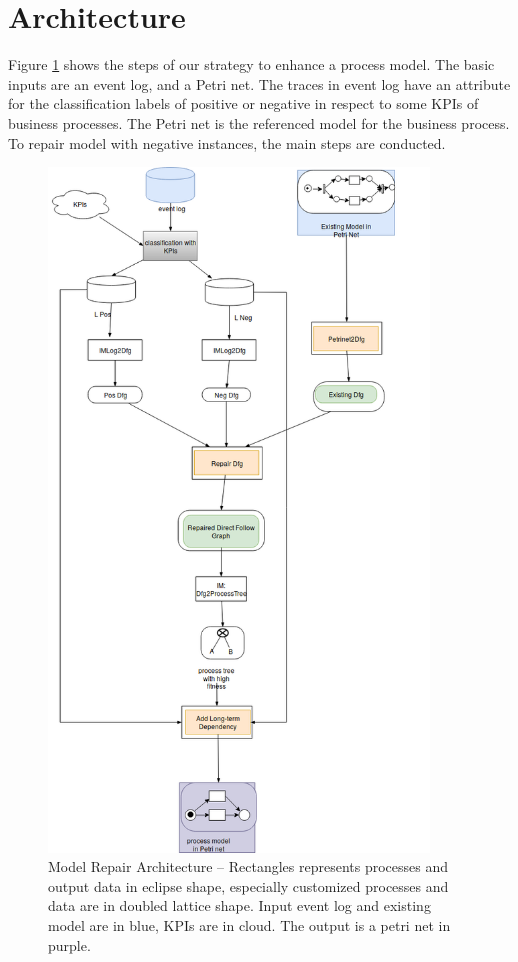 \section{Architecture}
Figure \ref{fig:architecture} shows the steps of our strategy to enhance a process model. The basic inputs are an event log, and a Petri net. The traces in event log have an attribute for the classification labels of positive or negative in respect to some KPIs of business processes. The Petri net is the referenced model for the business process. To repair model with negative instances, the main steps are conducted.
\begin{figure}
	\includegraphics[width=0.9\textwidth, height=0.9\textheight]{figures/algorithm/FD_architecture_detail_02.png}
	\caption[Model Repair Architecture]{Model Repair Architecture -- \small Rectangles represents processes and output data in eclipse shape, especially customized processes and data are in doubled lattice shape. Input event log and existing model are in blue, KPIs are in cloud. The output is a petri net in purple. }
	\label{fig:architecture}
\end{figure} 
